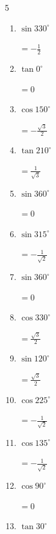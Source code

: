\begin{multicols}{5}
\begin{enumerate}
        $\displaystyle =\frac{\sqrt{3}}{2}$

  \item $\displaystyle \sin{330^\circ}$

        $\displaystyle =-\frac{1}{2}$

  \item $\displaystyle \tan{0^\circ}$

        $\displaystyle =0$

  \item $\displaystyle \cos{150^\circ}$

        $\displaystyle =-\frac{\sqrt{3}}{2}$

\columnbreak %

  \item $\displaystyle \tan{210^\circ}$

        $\displaystyle =\frac{1}{\sqrt{3}}$

  \item $\displaystyle \sin{360^\circ}$

        $\displaystyle =0$

  \item $\displaystyle \sin{315^\circ}$

        $\displaystyle =-\frac{1}{\sqrt{2}}$

  \item $\displaystyle \sin{360^\circ}$

        $\displaystyle =0$

  \item $\displaystyle \cos{330^\circ}$

        $\displaystyle =\frac{\sqrt{3}}{2}$

  \item $\displaystyle \sin{120^\circ}$

        $\displaystyle =\frac{\sqrt{3}}{2}$

  \item $\displaystyle \cos{225^\circ}$

        $\displaystyle =-\frac{1}{\sqrt{2}}$

  \item $\displaystyle \cos{135^\circ}$

        $\displaystyle =-\frac{1}{\sqrt{2}}$

  \item $\displaystyle \cos{90^\circ}$

        $\displaystyle =0$

  \item $\displaystyle \tan{30^\circ}$


\end{enumerate}
\end{multicols}
